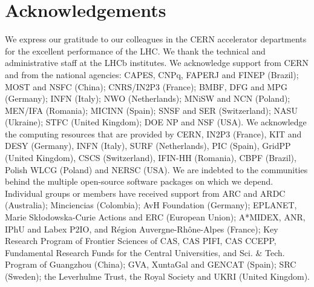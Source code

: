 \documentclass[12pt,a4paper]{article}
\begin{document}
\section*{Acknowledgements}
\noindent We express our gratitude to our colleagues in the CERN
accelerator departments for the excellent performance of the LHC. We
thank the technical and administrative staff at the LHCb
institutes.
We acknowledge support from CERN and from the national agencies:
CAPES, CNPq, FAPERJ and FINEP (Brazil); 
MOST and NSFC (China); 
CNRS/IN2P3 (France); 
BMBF, DFG and MPG (Germany); 
INFN (Italy); 
NWO (Netherlands); 
MNiSW and NCN (Poland); 
MEN/IFA (Romania); 
MICINN (Spain); 
SNSF and SER (Switzerland); 
NASU (Ukraine); 
STFC (United Kingdom); 
DOE NP and NSF (USA).
We acknowledge the computing resources that are provided by CERN, IN2P3
(France), KIT and DESY (Germany), INFN (Italy), SURF (Netherlands),
PIC (Spain), GridPP (United Kingdom), 
CSCS (Switzerland), IFIN-HH (Romania), CBPF (Brazil),
Polish WLCG  (Poland) and NERSC (USA).
We are indebted to the communities behind the multiple open-source
software packages on which we depend.
Individual groups or members have received support from
ARC and ARDC (Australia);
Minciencias (Colombia);
AvH Foundation (Germany);
EPLANET, Marie Sk\l{}odowska-Curie Actions and ERC (European Union);
A*MIDEX, ANR, IPhU and Labex P2IO, and R\'{e}gion Auvergne-Rh\^{o}ne-Alpes (France);
Key Research Program of Frontier Sciences of CAS, CAS PIFI, CAS CCEPP, 
Fundamental Research Funds for the Central Universities, 
and Sci. \& Tech. Program of Guangzhou (China);
GVA, XuntaGal and GENCAT (Spain);
SRC (Sweden);
the Leverhulme Trust, the Royal Society
 and UKRI (United Kingdom).

 









\end{document}
